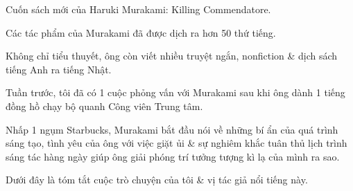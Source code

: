 \documentclass{article}
\begin{document}
\textsf{Cuốn sách mới của Haruki Murakami: Killing Commendatore.}

Các tác phẩm của Murakami đã được dịch ra hơn 50 thứ tiếng.

Không chỉ tiểu thuyết, ông còn viết nhiều truyệt ngắn, nonfiction \& dịch sách tiếng Anh ra tiếng Nhật.

Tuần trước, tôi đã có 1 cuộc phỏng vấn với Murakami sau khi ông dành 1 tiếng đồng hồ chạy bộ quanh Công viên Trung tâm.

Nhấp 1 ngụm Starbucks, Murakami bắt đầu nói về những bí ẩn của quá trình sáng tạo, tình yêu của ông với việc giặt ủi \& sự nghiêm khắc tuân thủ lịch trình sáng tác hàng ngày giúp ông giải phóng trí tưởng tượng kì lạ của mình ra sao.

Dưới đây là tóm tắt cuộc trò chuyện của tôi \& vị tác giả nổi tiếng này.
\end{document}
